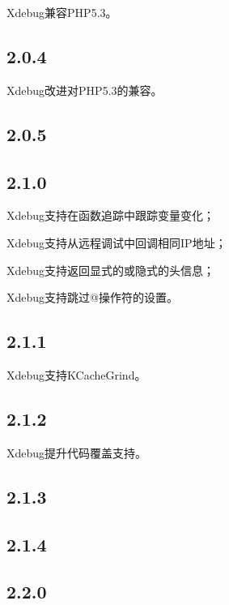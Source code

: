 Xdebug兼容PHP5.3。

\subsection{2.0.4}


Xdebug改进对PHP5.3的兼容。



\subsection{2.0.5}

\subsection{2.1.0}

\begin{compactitem}
\item Xdebug支持在函数追踪中跟踪变量变化；
\item Xdebug支持从远程调试中回调相同IP地址；
\item Xdebug支持返回显式的或隐式的头信息；
\item Xdebug支持跳过@操作符的设置。
\end{compactitem}


\subsection{2.1.1}

\begin{compactitem}
\item Xdebug支持KCacheGrind。
\end{compactitem}


\subsection{2.1.2}

Xdebug提升代码覆盖支持。


\subsection{2.1.3}

\subsection{2.1.4}

\subsection{2.2.0}


